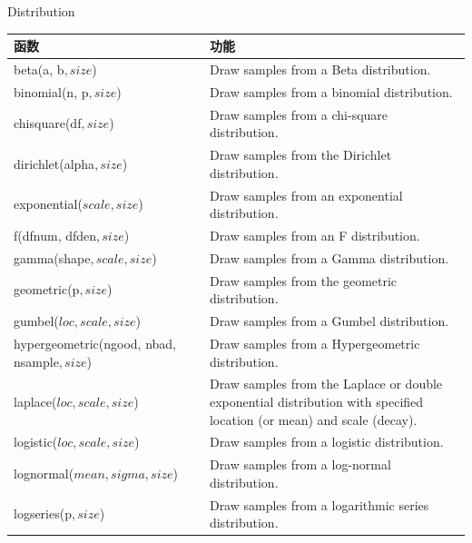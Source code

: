 \documentclass[ignorenonframetext,11pt,xcolor=dvipsnames,hyperref={colorlinks,allcolors=.,urlcolor=blue, citecolor=violet, bookmarksdepth=4},aspectratio=1610]{beamer}
\begin{document}
\begin{frame}{Distribution}
\protect\hypertarget{distribution}{}

\scriptsize

\begin{longtable}[]{@{}ll@{}}
\toprule
函数 & 功能\tabularnewline
\midrule
\endhead
beta(a, b\(, size\)) & Draw samples from a Beta
distribution.\tabularnewline
binomial(n, p\(, size\)) & Draw samples from a binomial
distribution.\tabularnewline
chisquare(df\(, size\)) & Draw samples from a chi-square
distribution.\tabularnewline
dirichlet(alpha\(, size\)) & Draw samples from the Dirichlet
distribution.\tabularnewline
exponential(\(scale, size\)) & Draw samples from an exponential
distribution.\tabularnewline
f(dfnum, dfden\(, size\)) & Draw samples from an F
distribution.\tabularnewline
gamma(shape\(, scale, size\)) & Draw samples from a Gamma
distribution.\tabularnewline
geometric(p\(, size\)) & Draw samples from the geometric
distribution.\tabularnewline
gumbel(\(loc, scale, size\)) & Draw samples from a Gumbel
distribution.\tabularnewline
hypergeometric(ngood, nbad, nsample\(, size\)) & Draw samples from a
Hypergeometric distribution.\tabularnewline
laplace(\(loc, scale, size\)) & Draw samples from the Laplace or double
exponential distribution with specified location (or mean) and scale
(decay).\tabularnewline
logistic(\(loc, scale, size\)) & Draw samples from a logistic
distribution.\tabularnewline
lognormal(\(mean, sigma, size\)) & Draw samples from a log-normal
distribution.\tabularnewline
logseries(p\(, size\)) & Draw samples from a logarithmic series
distribution.\tabularnewline
\bottomrule
\end{longtable}

\end{frame}
\end{document}
